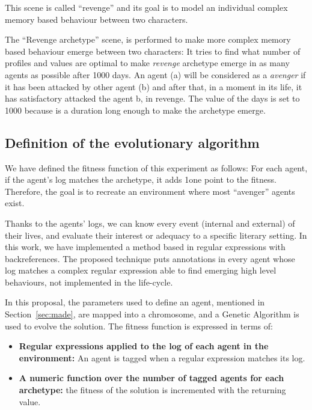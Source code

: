 \documentclass{sig-alternate}
\begin{document}
 This scene is called ``revenge'' and its goal is to model an individual complex memory
based behaviour between two characters.

The ``Revenge archetype'' scene, is performed to make more complex memory based behaviour emerge between two characters:  It tries to find what number of profiles and values are optimal to make \textit{revenge} archetype emerge in as many agents as possible after 1000 days.  An agent (a) will be considered as a \textit{avenger} if it has been attacked by other agent (b) and after that, in a moment in its life, it has satisfactory attacked the agent b, in revenge. The value of the days is set to 1000 because is a duration long enough to make the archetype emerge. 

\subsection{Definition of  the evolutionary algorithm}

We have defined the fitness function of this experiment as follows:
For each agent, if the agent's log matches the archetype, it adds 1one point to the fitness. Therefore, the goal is to recreate an environment where most ``avenger'' agents exist.

Thanks to the agents' logs, we can know every event (internal and
external) of their lives, and evaluate their interest or
adequacy to a specific literary setting.
In this work, we have implemented a method based in regular expressions with backreferences. The proposed technique puts annotations in every agent whose log matches a complex regular expression able to find emerging high level behaviours, not implemented in the life-cycle.

In this proposal, the parameters used to define an agent, mentioned in Section~\ref{sec:made}, are mapped into a chromosome, and a Genetic Algorithm is used to evolve the solution. The fitness function is expressed in terms of:

\begin{itemize}
\item \textbf{Regular expressions applied to the log of each agent in the environment:} An agent is tagged when a regular expression matches its log.
\item \textbf{A numeric function over the number of tagged agents for each archetype:} the fitness of the solution is incremented with the returning value.
\end{itemize}
\end{document}
